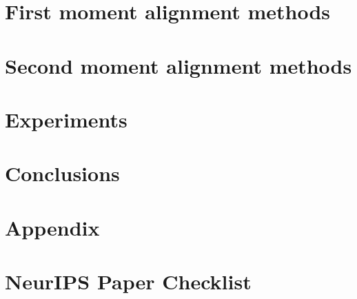 \documentclass{article}
\begin{document}
\section{First moment alignment methods}\label{sec:1st}


\section{Second moment alignment methods}


\section{Experiments}


\section{Conclusions}




\clearpage



% 

\appendix
\clearpage
\section{Appendix}




\clearpage
\section*{NeurIPS Paper Checklist}

\end{document}
